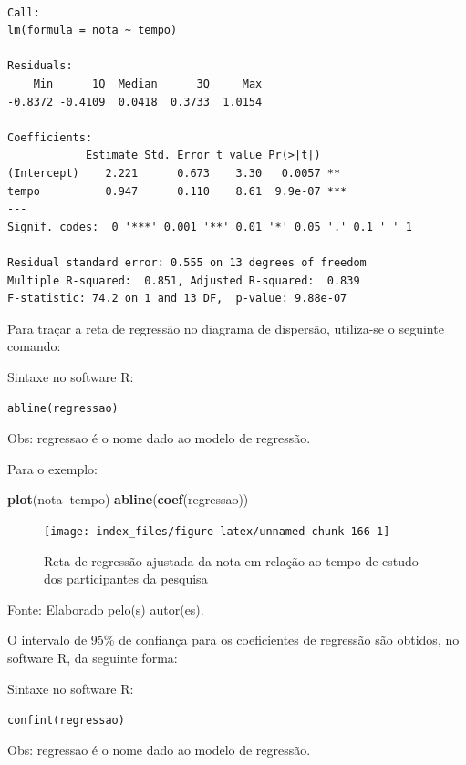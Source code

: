 \documentclass[12pt,brazil,oneside]{book}
\newenvironment{Shaded}{\begin{snugshade}}{\end{snugshade}}
\newcommand{\KeywordTok}[1]{\textcolor[rgb]{0.13,0.29,0.53}{\textbf{#1}}}
\newcommand{\NormalTok}[1]{#1}
\newcommand{\OperatorTok}[1]{\textcolor[rgb]{0.81,0.36,0.00}{\textbf{#1}}}
\begin{document}
\begin{verbatim}

Call:
lm(formula = nota ~ tempo)

Residuals:
    Min      1Q  Median      3Q     Max 
-0.8372 -0.4109  0.0418  0.3733  1.0154 

Coefficients:
            Estimate Std. Error t value Pr(>|t|)    
(Intercept)    2.221      0.673    3.30   0.0057 ** 
tempo          0.947      0.110    8.61  9.9e-07 ***
---
Signif. codes:  0 '***' 0.001 '**' 0.01 '*' 0.05 '.' 0.1 ' ' 1

Residual standard error: 0.555 on 13 degrees of freedom
Multiple R-squared:  0.851, Adjusted R-squared:  0.839 
F-statistic: 74.2 on 1 and 13 DF,  p-value: 9.88e-07
\end{verbatim}

Para traçar a reta de regressão no diagrama de dispersão, utiliza-se o seguinte comando:

Sintaxe no software R:

\texttt{abline(regressao)}

Obs: regressao é o nome dado ao modelo de regressão.

Para o exemplo:

\begin{Shaded}
\begin{Highlighting}[]
\KeywordTok{plot}\NormalTok{(nota}\OperatorTok{~}\NormalTok{tempo)}
\KeywordTok{abline}\NormalTok{(}\KeywordTok{coef}\NormalTok{(regressao))}
\end{Highlighting}
\end{Shaded}

\begin{figure}[H]

{\centering \texttt{[image: index\_files/figure-latex/unnamed-chunk-166-1]} 

}

\caption{Reta de regressão ajustada da nota em relação ao tempo de estudo dos participantes da pesquisa}\label{fig:unnamed-chunk-166}
\end{figure}

Fonte: Elaborado pelo(s) autor(es).

O intervalo de 95\% de confiança para os coeficientes de regressão são obtidos, no software R, da seguinte forma:

Sintaxe no software R:

\texttt{confint(regressao)}

Obs: regressao é o nome dado ao modelo de regressão.
\end{document}
